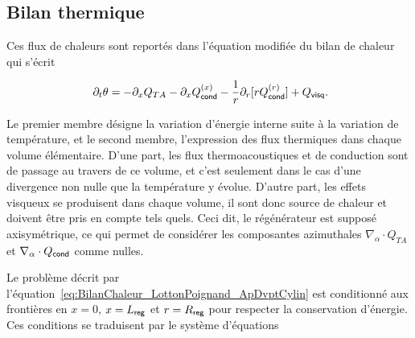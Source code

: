 \subsection{Bilan thermique}

Ces flux de chaleurs sont reportés dans l'équation modifiée du bilan de chaleur qui s'écrit


\begin{equation}
[\Phi\rho_0 C_p + (1-\Phi)\rho_s C_s]\ \partial_t \theta = - \partial_x Q_{TA} - \partial_x Q_{\sf cond}^{(x)} - \frac{1}{r}\partial_r[r Q_{\sf cond}^{(r)}] + Q_{\sf visq}.
\label{eq:BilanChaleur_LottonPoignand_ApDvptCylin}
\end{equation}

Le premier membre désigne la variation d'énergie interne suite à la variation de température, et le second membre, l'expression des flux thermiques dans chaque volume élémentaire. D'une part, les flux thermoacoustiques et de conduction sont \og de passage \fg{} au travers de ce volume, et c'est seulement dans le cas d'une divergence non nulle que la température y évolue. D'autre part, les effets visqueux se produisent dans chaque volume, il sont donc source de chaleur et doivent être pris en compte tels quels. Ceci dit, le régénérateur est supposé axisymétrique, ce qui permet de considérer les composantes azimuthales $\nabla_\alpha \cdot Q_{TA}$ et $\nabla_\alpha \cdot Q_{\sf cond}$ comme nulles.

Le problème décrit par l'équation~\ref{eq:BilanChaleur_LottonPoignand_ApDvptCylin} est conditionné aux frontières en $x=0$, $x=L_{\sf reg}$ et $r=R_{\sf reg}$ pour respecter la conservation d'énergie. Ces conditions se traduisent par le système d'équations

